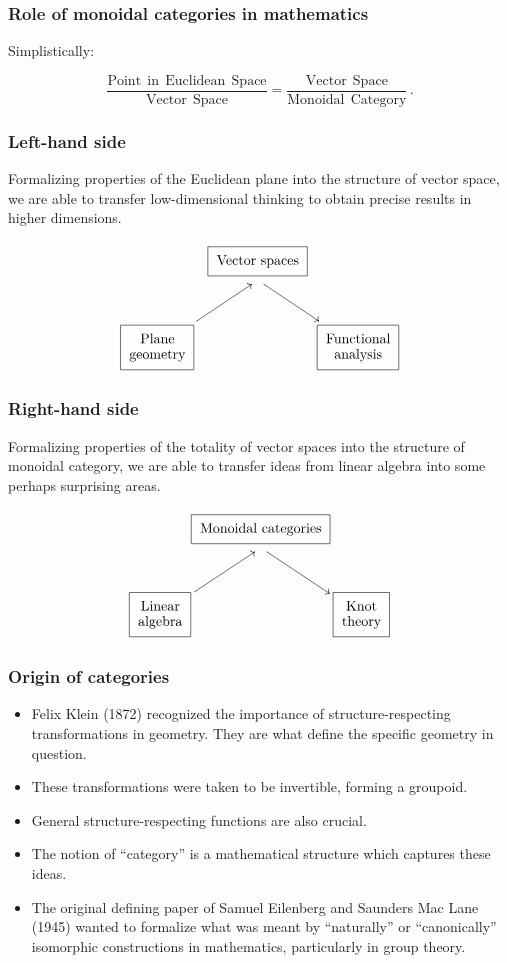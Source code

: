 \documentclass{beamer}
\begin{document}
\begin{frame}
  \frametitle{Role of monoidal categories in mathematics}
  
  Simplistically:
  \bigskip
  
\[
\frac{\mathrm{Point \ \ in \ \ Euclidean \ \ Space}}{\mathrm{Vector \ \ Space}}=\frac{\mathrm{Vector \ \ Space}}{\mathrm{Monoidal \ \ Category}}\,.
\]
\end{frame}

\begin{frame}
  \frametitle{Left-hand side}

\noindent Formalizing properties of the Euclidean plane into the structure of vector space, 
we are able to transfer low-dimensional thinking to obtain precise results in higher dimensions.

\[
\xygraph{ !{\UseTips}
 !{/r6pc/: /u4pc/::}
 []*++[F-]+!C\txt{Vector spaces} !{+D*+!C\txt{ \ }} 
 ( [dl] *++[F-]+\txt{Plane\\geometry} : ?
 , ? : [dr] *++[F-]+\txt{Functional\\analysis}
 )
}\]
\end{frame}

\begin{frame}
  \frametitle{Right-hand side}
\noindent Formalizing properties of the totality of vector spaces into the structure of monoidal category, we are able to transfer ideas from linear algebra into some perhaps surprising areas.

\[
\xygraph{  !{\UseTips}!{/u4pc/::}
 !{/r6pc/: /u4pc/::}
 []*++[F-]+!C\txt{Monoidal categories} !{+D*+!C\txt{ \ }} 
 ( [dl] *++[F-]+\txt{Linear\\algebra} : ?
 , ? : [dr] *++[F-]+\txt{Knot\\theory}
 )
}\]
\end{frame}

\begin{frame}
 \frametitle{Origin of categories}
\begin{itemize}
\item Felix Klein (1872) recognized the importance of structure-respecting transformations in geometry.
They are what define the specific geometry in question.
\pause
\item These transformations were taken to be invertible, forming a groupoid.
\pause
\item General structure-respecting functions are also crucial.
\pause
\item The notion of ``category'' is a mathematical structure which captures these ideas.
\pause
\item The original defining paper of Samuel Eilenberg and Saunders Mac Lane (1945)
wanted to formalize what was meant by ``naturally'' or ``canonically'' isomorphic constructions in mathematics,
particularly in group theory.
\end{itemize}
\end{frame}
\end{document}

